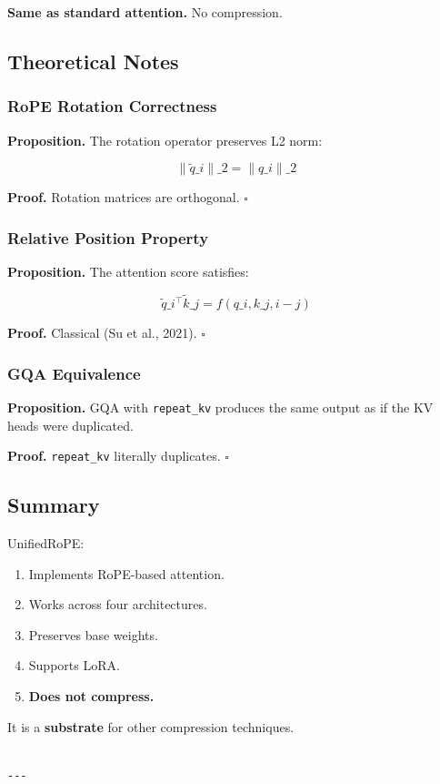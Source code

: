 \textbf{Same as standard attention.} No compression.

\subsection{Theoretical Notes}

\subsubsection{RoPE Rotation Correctness}

\textbf{Proposition.} The rotation operator preserves L2 norm:

\[
\|\tilde{q}\_i\|\_2 = \|q\_i\|\_2
\tag{4.1}
\]

\textbf{Proof.} Rotation matrices are orthogonal. $\square$

\subsubsection{Relative Position Property}

\textbf{Proposition.} The attention score satisfies:

\[
\tilde{q}\_i^\top \tilde{k}\_j = f(q\_i, k\_j, i - j)
\tag{4.2}
\]

\textbf{Proof.} Classical (Su et al., 2021). $\square$

\subsubsection{GQA Equivalence}

\textbf{Proposition.} GQA with \texttt{repeat\_kv} produces the same output as if the 
KV heads were duplicated.

\textbf{Proof.} \texttt{repeat\_kv} literally duplicates. $\square$

\subsection{Summary}

UnifiedRoPE:
\begin{enumerate}
\item Implements RoPE-based attention.
\item Works across four architectures.
\item Preserves base weights.
\item Supports LoRA.
\item \textbf{Does not compress.}

\end{enumerate}
It is a \textbf{substrate} for other compression techniques.
\begin{lstlisting}

---
\end{lstlisting}
